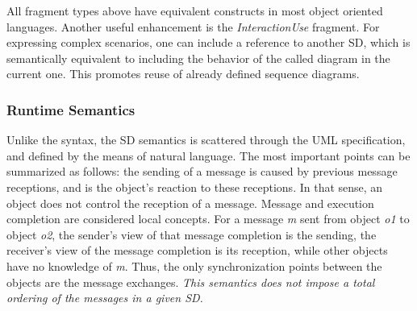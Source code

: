 \documentclass[letter]{llncs}
\newcommand{\subsecshrink}{\vspace{-.5cm}}
\newcommand{\subsecshrinkbegin}{\vspace{-.2cm}}
\begin{document}
All fragment types above have equivalent constructs in most object oriented languages. 
Another useful enhancement is the \emph{InteractionUse} fragment. For expressing
complex scenarios, one can include a reference to another SD, which is semantically
equivalent to including the behavior of the called diagram in the current one. This promotes reuse of already defined
sequence diagrams. 
\vspace{-12 pt}

\subsecshrinkbegin
\subsubsection{Runtime Semantics}
Unlike the syntax, the SD semantics is scattered through the UML specification, and defined by the means of natural language. 
The most important points can be summarized as follows: the sending of a message is caused by previous message
receptions, and is the object's reaction to these receptions. In that sense, an object does not control the reception of a message.
Message and execution completion are considered local concepts.
For a message \emph{m} sent from object \emph{o1} to object \emph{o2}, the sender's view of that message completion is 
the sending, the receiver's view of the message completion is its reception, while other objects have no knowledge of \emph{m}.
Thus, the only synchronization points between the objects are the message exchanges.
\emph{This semantics does not impose a total ordering of the messages in a given SD.}

\subsecshrink
\end{document}
